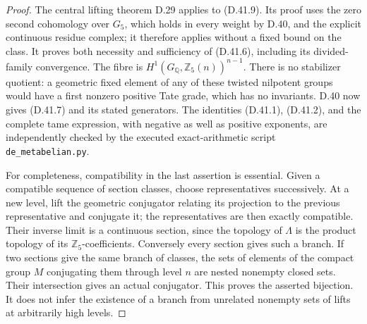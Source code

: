 \begin{proof}
The central lifting theorem D.29 applies to
(D.41.9). Its proof uses the zero second
cohomology over \(G_5\), which holds in every
weight by D.40, and the explicit continuous
residue complex; it therefore applies without
a fixed bound on the class. It proves both
necessity and sufficiency of (D.41.6),
including its divided-family convergence.
The fibre is \(H^1(G_{\mathbb Q},\mathbb Z_5(n))^{n-1}\).
There is no stabilizer quotient: a geometric
fixed element of any of these twisted nilpotent
groups would have a first nonzero positive
Tate grade, which has no invariants. D.40 now
gives (D.41.7) and its stated generators.
The identities (D.41.1), (D.41.2), and the
complete tame expression, with negative as
well as positive exponents, are independently
checked by the executed exact-arithmetic script
\texttt{de\_metabelian.py}.

For completeness, compatibility in the last
assertion is essential. Given a compatible
sequence of section classes, choose representatives
successively. At a new level, lift the geometric
conjugator relating its projection to the previous
representative and conjugate it; the representatives
are then exactly compatible. Their inverse limit
is a continuous section, since the topology of
\(\Lambda\) is the product topology of its
\(\mathbb Z_5\)-coefficients. Conversely every
section gives such a branch. If two sections
give the same branch of classes, the sets of
elements of the compact group \(M\) conjugating
them through level \(n\) are nested nonempty
closed sets. Their intersection gives an
actual conjugator. This proves the asserted
bijection. It does not infer the existence
of a branch from unrelated nonempty sets
of lifts at arbitrarily high levels.
\end{proof}

